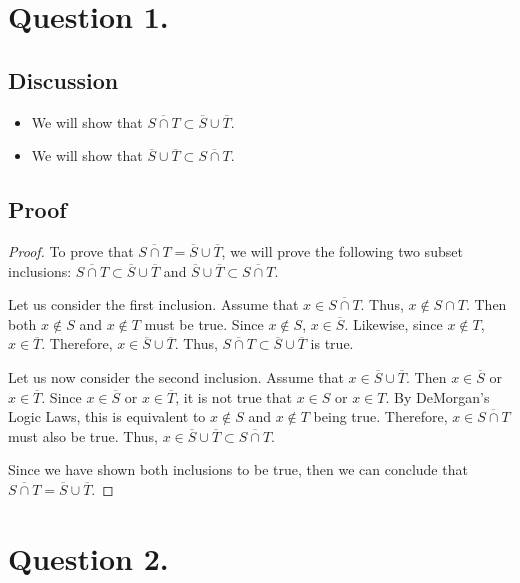 \documentclass{article}
\begin{document}
\section*{Question 1.}
\subsection*{Discussion}
\begin{itemize}
    \item We will show that $ \overline{S \cap T} \subset \overline{S} \cup \overline{T} $.
    \item We will show that $ \overline{S} \cup \overline{T} \subset \overline{S \cap T} $.
\end{itemize}

\subsection*{Proof}
\begin{proof}
    To prove that $ \overline{S \cap T} = \overline{S} \cup \overline{T} $, we will prove the following two subset inclusions:
    $ \overline{S \cap T} \subset \overline{S} \cup \overline{T} $ and $ \overline{S} \cup \overline{T} \subset \overline{S \cap T} $.

    \noindent Let us consider the first inclusion. Assume that $ x \in \overline{S \cap T} $. Thus, $ x \notin S \cap T $. Then both
    $ x \notin S $ and $ x \notin T $ must be true. Since $ x \notin S $, $ x \in \overline{S} $. Likewise, since $ x \notin T $, $ x \in \overline{T} $.
    Therefore, $ x \in \overline{S} \cup \overline{T} $. Thus, $ \overline{S \cap T} \subset \overline{S} \cup \overline{T} $ is true.

    \noindent Let us now consider the second inclusion. Assume that $ x \in \overline{S} \cup \overline{T} $. Then $ x \in \overline{S} $ or $ x \in \overline{T} $. Since $ x \in \overline{S} $ or $ x \in \overline{T} $, it is not true that $ x \in S $ or $ x \in T $. By DeMorgan's Logic Laws, this is equivalent to $ x \notin S $ and $ x \notin T $ being true. Therefore, $ x \in \overline{S \cap T} $ must also be true.
    Thus, $ x \in \overline{S} \cup \overline{T}  \subset \overline{S \cap T} $.

    \noindent Since we have shown both inclusions to be true, then we can conclude that $ \overline{S \cap T} = \overline{S} \cup \overline{T} $.
\end{proof}

\section*{Question 2.}
\end{document}

